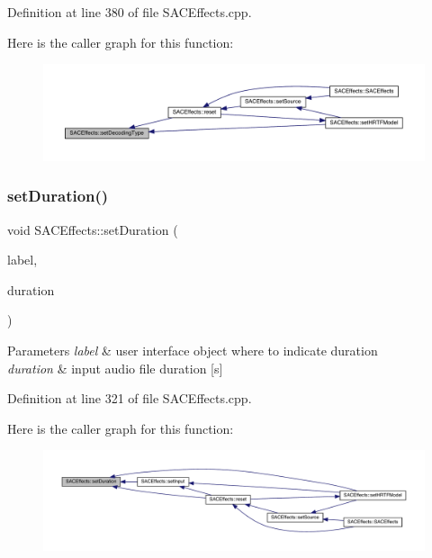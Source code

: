 Definition at line 380 of file S\+A\+C\+Effects.\+cpp.

Here is the caller graph for this function\+:
\nopagebreak
\begin{figure}[H]
\begin{center}
\leavevmode
\includegraphics[width=350pt]{class_s_a_c_effects_a07d9b0135f5811a7b6e2d5d98c26fafe_icgraph}
\end{center}
\end{figure}
\mbox{\label{class_s_a_c_effects_a69e964cefe25c40e7852cf7baeda28fd}} 
\subsubsection{\texorpdfstring{set\+Duration()}{setDuration()}}
{\footnotesize\ttfamily void S\+A\+C\+Effects\+::set\+Duration (\begin{DoxyParamCaption}\item[{Q\+Label $\ast$}]{label,  }\item[{double}]{duration }\end{DoxyParamCaption})}


\begin{DoxyParams}{Parameters}
{\em label} & user interface object where to indicate duration \\
\hline
{\em duration} & input audio file duration \mbox{[}s\mbox{]} \\
\hline
\end{DoxyParams}


Definition at line 321 of file S\+A\+C\+Effects.\+cpp.

Here is the caller graph for this function\+:
\nopagebreak
\begin{figure}[H]
\begin{center}
\leavevmode
\includegraphics[width=350pt]{class_s_a_c_effects_a69e964cefe25c40e7852cf7baeda28fd_icgraph}
\end{center}
\end{figure}
\mbox{\label{class_s_a_c_effects_ab57fa3b5c11bafba4c2e471a80964c14}} 
